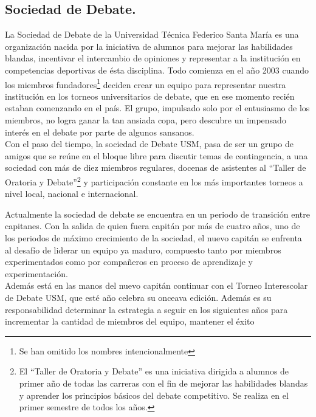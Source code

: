 \documentclass{article}
\begin{document}
\begin{adjustwidth}{-1.5cm}{-1.5cm}
	\section*{Sociedad de Debate.}
	La Sociedad de Debate de la Universidad Técnica Federico Santa María es una 
	organización nacida por la iniciativa de alumnos para mejorar las habilidades
	blandas, incentivar el intercambio de opiniones y representar a la institución
	en competencias deportivas de ésta disciplina. Todo comienza en el año 2003 cuando
	los miembros fundadores\footnote{Se han omitido los nombres intencionalmente} 
	deciden crear un equipo para representar nuestra institución
	en los torneos universitarios de debate, que en ese momento recién estaban
	comenzando en el país. El grupo, impulsado solo por el entusiasmo de los
	miembros, no logra ganar la tan ansiada copa, pero descubre un impensado
	interés en el debate por parte de algunos sansanos.\\[0.15cm]
	Con el paso del tiempo, la sociedad de Debate USM, pasa de ser un grupo de
	amigos que se reúne en el bloque libre para discutir temas de contingencia,
	a una sociedad con más de diez miembros regulares, docenas de asistentes al
	``Taller de Oratoria y Debate''\footnote{El ``Taller de Oratoria y Debate'' 
	es una iniciativa dirigida a alumnos de primer año de todas las carreras con
	el fin de mejorar las habilidades blandas y aprender los principios básicos
	del debate competitivo. Se realiza en el primer semestre de todos los años.}
	y participación constante en los más importantes torneos a nivel 
	local\cite{local}, nacional\cite{nac} e internacional\cite{inter}.\\[0.15cm]
	\begin{minipage}{0.7\textwidth}
		Actualmente la sociedad de debate se encuentra en un periodo de transición
		entre capitanes. Con la salida de quien fuera capitán por más de cuatro años,
		uno de los periodos de máximo crecimiento de la sociedad, el nuevo capitán
		se enfrenta al desafío de liderar un equipo ya maduro, compuesto tanto
		por miembros experimentados como por compañeros en proceso de aprendizaje
		y experimentación.\\
		Además está en las manos del nuevo capitán continuar con el Torneo Interescolar
		de Debate USM\cite{nac}, que esté año celebra su onceava edición. Además
		es su responsabilidad determinar la estrategia a seguir en los siguientes
		años para incrementar la cantidad de miembros del equipo, mantener el éxito

\end{minipage}
\end{adjustwidth}
\end{document}
